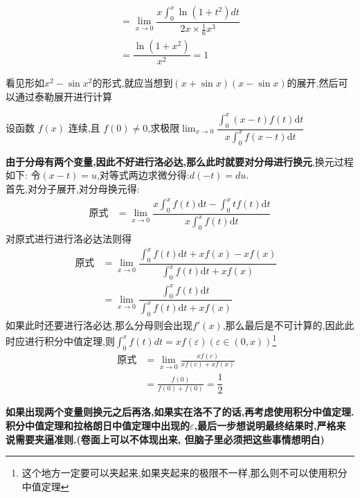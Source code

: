 \documentclass[8pt a4paper, oneside, UTF8]{ctexbook}
\begin{document}
\begin{sloppypar}
\begin{solution}
\begin{align*}
                      & =  \lim_{x\to0}\dfrac{x\int_0^x\ln{(1+t^2)}dt}{2x \times \frac{1}{6}x^3} & \\
                      & = \dfrac{\ln(1+x^2)}{x^2}=1
        \end{align*}
    \end{solution}
    \begin{note}
        看见形如$x^2-\sin x^2$的形式,就应当想到$(x+\sin x)(x-\sin x)$的展开,然后可以通过泰勒展开进行计算
    \end{note}
    \begin{problem}
    设函数 $f(x)$ 连续,且 $f(0)\neq0$,求极限$\operatorname*{lim}_{x\to0}{\dfrac{\int_{0}^{x}\left(x-t\right)f\left(t\right)\mathrm{d}t}{x\int_{0}^{x}f\left(x-t\right)\mathrm{d}t}}$
    \end{problem}
    \begin{solution}
        \textbf{由于分母有两个变量,因此不好进行洛必达,那么此时就要对分母进行换元},换元过程如下:
        令$(x-t)=u$,对等式两边求微分得:$d(-t)=du$.\\
        首先,对分子展开,对分母换元得:
        \begin{align*}
            \text{原式} & = \lim_{x\to0}\dfrac{x\int_{0}^{x}f(t)\mathrm{d}t-\int_{0}^{x}tf\left(t\right)\mathrm{d}t}{x\int_{0}^{x}f(t)\mathrm{d}t}
        \end{align*}
        对原式进行进行洛必达法则得
        \begin{align*}
            \text{原式} & = \lim_{x\to0}\dfrac{\int_0^xf(t)\mathrm{d}t+xf(x)-xf(x)}{\int_0^xf(t)\mathrm{d}t+xf(x)} & \\
                      & =  \lim\limits_{x\to0}\dfrac{\int_0^xf(t)\mathrm{d}t}{\int_0^xf(t)\mathrm{d}t+xf(x)}
        \end{align*}
        如果此时还要进行洛必达,那么分母则会出现$f'(x)$,那么最后是不可计算的,因此此时应进行积分中值定理,则$\int _0 ^x f(t)dt=xf(\varepsilon) (\varepsilon \in (0,x))$\footnote{这个地方一定要可以夹起来,如果夹起来的极限不一样,那么则不可以使用积分中值定理}
        \begin{align*}
            \text{原式} & = \lim_{x\to0}\frac{xf\left(c\right)}{xf\left(c\right)+xf\left(x\right)} & \\
                      & = \frac{f(0)}{f(0)+f(0)}=\dfrac12
        \end{align*}
    \end{solution}
    \begin{note}
        \textbf{如果出现两个变量则换元之后再洛,如果实在洛不了的话,再考虑使用积分中值定理.积分中值定理和拉格朗日中值定理中出现的$\varepsilon$,最后一步想说明最终结果时,严格来说需要夹逼准则.(卷面上可以不体现出来, 但脑子里必须把这些事情想明白)}\\

\end{note}
\end{sloppypar}
\end{document}
